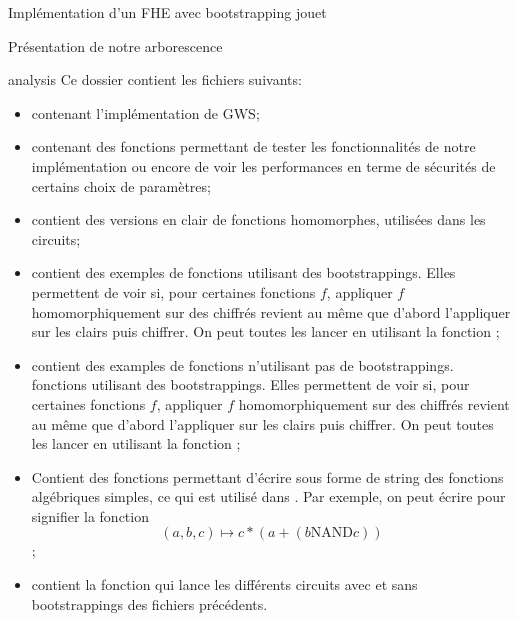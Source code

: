 \begin{section}{Implémentation d'un FHE avec bootstrapping \og{} jouet\fg{}}
\begin{subsection}{Présentation de notre arborescence}
\begin{subsubsection}{analysis}
Ce dossier contient les fichiers suivants:
\begin{itemize}
\item {} contenant l'implémentation de GWS;
\item {} contenant des fonctions permettant 
	de tester les fonctionnalités de notre implémentation 
	ou encore de voir les performances 
	en terme de sécurités de certains choix de paramètres;
\item {} contient des versions \og en clair \fg
	de fonctions homomorphes, utilisées dans les circuits;
\item {} contient des exemples de
	fonctions utilisant des bootstrappings. Elles permettent de voir 
	si, pour certaines fonctions $f$, appliquer $f$ homomorphiquement 
	sur des chiffrés revient au même que d'abord l'appliquer sur les 
	clairs puis chiffrer.
	On peut toutes les lancer en  
	utilisant  la fonction ;
\item {} contient des examples de
	fonctions n'utilisant pas de bootstrappings. 
	fonctions utilisant des bootstrappings. Elles permettent de voir 
	si, pour certaines fonctions $f$, appliquer $f$ homomorphiquement 
	sur des chiffrés revient au même que d'abord l'appliquer sur les 
	clairs puis chiffrer.
	On peut toutes les lancer en  
	utilisant  la fonction ;
\item {} Contient des fonctions permettant d'écrire 
	sous forme de string des fonctions algébriques simples, ce qui est utilisé
	dans  . Par exemple, on 
	peut écrire  pour signifier la fonction
	\[(a,b,c) \mapsto c * (a + (b \text{NAND} c)) \];
\item {} contient la fonction
	 qui lance les différents circuits avec et sans
	bootstrappings des fichiers précédents. 
\end{itemize}
\end{subsubsection} %


\end{subsection}
\end{section}
